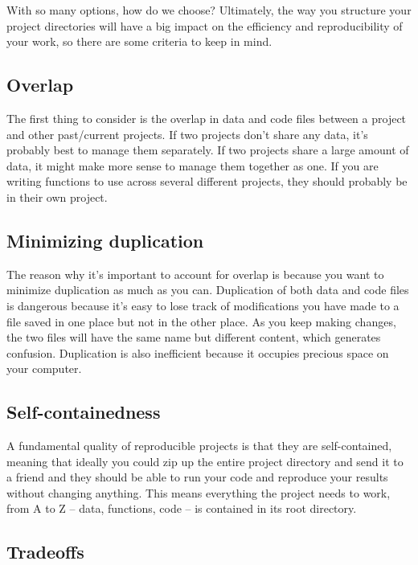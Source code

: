 \documentclass[
]{book}
\begin{document}
With so many options, how do we choose? Ultimately, the way you structure your project directories will have a big impact on the efficiency and reproducibility of your work, so there are some criteria to keep in mind.

\hypertarget{overlap}{%
\subsection{Overlap}\label{overlap}}

The first thing to consider is the overlap in data and code files between a project and other past/current projects. If two projects don't share any data, it's probably best to manage them separately. If two projects share a large amount of data, it might make more sense to manage them together as one. If you are writing functions to use across several different projects, they should probably be in their own project.

\hypertarget{minimizing-duplication}{%
\subsection{Minimizing duplication}\label{minimizing-duplication}}

The reason why it's important to account for overlap is because you want to minimize duplication as much as you can. Duplication of both data and code files is dangerous because it's easy to lose track of modifications you have made to a file saved in one place but not in the other place. As you keep making changes, the two files will have the same name but different content, which generates confusion. Duplication is also inefficient because it occupies precious space on your computer.

\hypertarget{self-containedness}{%
\subsection{Self-containedness}\label{self-containedness}}

A fundamental quality of reproducible projects is that they are self-contained, meaning that ideally you could zip up the entire project directory and send it to a friend and they should be able to run your code and reproduce your results without changing anything. This means everything the project needs to work, from A to Z -- data, functions, code -- is contained in its root directory.

\hypertarget{tradeoffs}{%
\subsection{Tradeoffs}\label{tradeoffs}}
\end{document}
